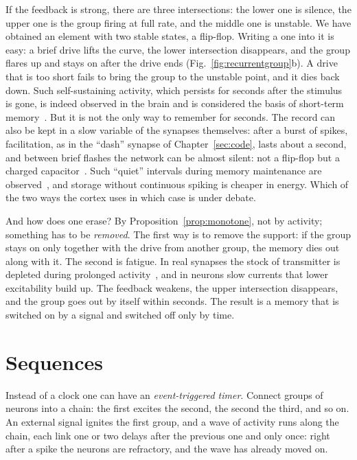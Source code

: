 If the feedback is strong, there are three intersections: the lower one is silence, the upper one is the group firing at full rate, and the middle one is unstable. We have obtained an element with two stable states, a flip-flop. Writing a one into it is easy: a brief drive lifts the curve, the lower intersection disappears, and the group flares up and stays on after the drive ends (Fig.~\ref{fig:recurrentgroup}b). A drive that is too short fails to bring the group to the unstable point, and it dies back down. Such self-sustaining activity, which persists for seconds after the stimulus is gone, is indeed observed in the brain and is considered the basis of short-term memory~\cite{Wang2001}. But it is not the only way to remember for seconds. The record can also be kept in a slow variable of the synapses themselves: after a burst of spikes, facilitation, as in the ``dash'' synapse of Chapter~\ref{sec:code}, lasts about a second, and between brief flashes the network can be almost silent: not a flip-flop but a charged capacitor~\cite{Mongillo2008}. Such ``quiet'' intervals during memory maintenance are observed~\cite{Stokes2015}, and storage without continuous spiking is cheaper in energy. Which of the two ways the cortex uses in which case is under debate.

And how does one erase? By Proposition~\ref{prop:monotone}, not by activity; something has to be \emph{removed}. The first way is to remove the support: if the group stays on only together with the drive from another group, the memory dies out along with it. The second is fatigue. In real synapses the stock of transmitter is depleted during prolonged activity~\cite{Tsodyks1997}, and in neurons slow currents that lower excitability build up. The feedback weakens, the upper intersection disappears, and the group goes out by itself within seconds. The result is a memory that is switched on by a signal and switched off only by time.

\section{Sequences}

Instead of a clock one can have an \emph{event-triggered timer}. Connect groups of  neurons into a chain: the first excites the second, the second the third, and so on. An external signal ignites the first group, and a wave of activity runs along the chain, each link one or two delays after the previous one and only once: right after a spike the neurons are refractory, and the wave has already moved on.

